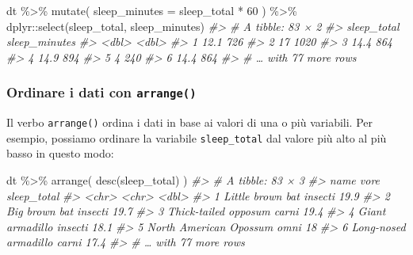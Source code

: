 \documentclass[
  10pt,
  italian,
  a4paper,
  extrafontsizes,onecolumn,openright
  ]{memoir}
\newenvironment{Shaded}{\begin{snugshade}}{\end{snugshade}}
\newcommand{\AttributeTok}[1]{\textcolor[rgb]{0.77,0.63,0.00}{#1}}
\newcommand{\CommentTok}[1]{\textcolor[rgb]{0.56,0.35,0.01}{\textit{#1}}}
\newcommand{\DecValTok}[1]{\textcolor[rgb]{0.00,0.00,0.81}{#1}}
\newcommand{\FunctionTok}[1]{\textcolor[rgb]{0.00,0.00,0.00}{#1}}
\newcommand{\NormalTok}[1]{#1}
\newcommand{\SpecialCharTok}[1]{\textcolor[rgb]{0.00,0.00,0.00}{#1}}
\begin{document}
\begin{Shaded}
\begin{Highlighting}[]
\NormalTok{dt }\SpecialCharTok{\%\textgreater{}\%} 
  \FunctionTok{mutate}\NormalTok{(}
    \AttributeTok{sleep\_minutes =}\NormalTok{ sleep\_total }\SpecialCharTok{*} \DecValTok{60}
\NormalTok{  ) }\SpecialCharTok{\%\textgreater{}\%}
\NormalTok{  dplyr}\SpecialCharTok{::}\FunctionTok{select}\NormalTok{(sleep\_total, sleep\_minutes)}
\CommentTok{\#\textgreater{} \# A tibble: 83 × 2}
\CommentTok{\#\textgreater{}   sleep\_total sleep\_minutes}
\CommentTok{\#\textgreater{}         \textless{}dbl\textgreater{}         \textless{}dbl\textgreater{}}
\CommentTok{\#\textgreater{} 1        12.1           726}
\CommentTok{\#\textgreater{} 2        17            1020}
\CommentTok{\#\textgreater{} 3        14.4           864}
\CommentTok{\#\textgreater{} 4        14.9           894}
\CommentTok{\#\textgreater{} 5         4             240}
\CommentTok{\#\textgreater{} 6        14.4           864}
\CommentTok{\#\textgreater{} \# … with 77 more rows}
\end{Highlighting}
\end{Shaded}

\hypertarget{ordinare-i-dati-con-arrange}{%
\subsubsection{\texorpdfstring{Ordinare i dati con \texttt{arrange()}}{Ordinare i dati con arrange()}}\label{ordinare-i-dati-con-arrange}}

Il verbo \texttt{arrange()} ordina i dati in base ai valori di una o più variabili. Per esempio, possiamo ordinare la variabile \texttt{sleep\_total} dal valore più alto al più basso in questo modo:

\begin{Shaded}
\begin{Highlighting}[]
\NormalTok{dt }\SpecialCharTok{\%\textgreater{}\%} 
  \FunctionTok{arrange}\NormalTok{(}
    \FunctionTok{desc}\NormalTok{(sleep\_total)}
\NormalTok{  )}
\CommentTok{\#\textgreater{} \# A tibble: 83 × 3}
\CommentTok{\#\textgreater{}   name                   vore    sleep\_total}
\CommentTok{\#\textgreater{}   \textless{}chr\textgreater{}                  \textless{}chr\textgreater{}         \textless{}dbl\textgreater{}}
\CommentTok{\#\textgreater{} 1 Little brown bat       insecti        19.9}
\CommentTok{\#\textgreater{} 2 Big brown bat          insecti        19.7}
\CommentTok{\#\textgreater{} 3 Thick{-}tailed opposum   carni          19.4}
\CommentTok{\#\textgreater{} 4 Giant armadillo        insecti        18.1}
\CommentTok{\#\textgreater{} 5 North American Opossum omni           18  }
\CommentTok{\#\textgreater{} 6 Long{-}nosed armadillo   carni          17.4}
\CommentTok{\#\textgreater{} \# … with 77 more rows}
\end{Highlighting}
\end{Shaded}
\end{document}

